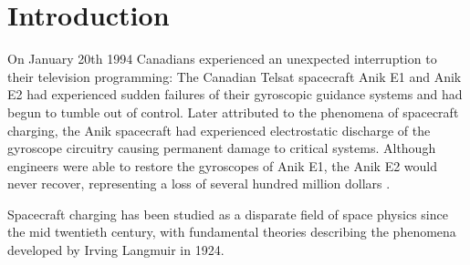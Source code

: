 \chapter{Introduction}
\label{sec:intro}

On January 20th 1994 Canadians experienced an unexpected interruption to their television programming: The Canadian Telsat spacecraft Anik E1 and Anik E2 had experienced sudden failures of their gyroscopic guidance systems and had begun to tumble out of control. Later attributed to the phenomena of spacecraft charging, the Anik spacecraft had experienced electrostatic discharge of the gyroscope circuitry causing permanent damage to critical systems. Although engineers were able to restore the gyroscopes of Anik E1, the Anik E2 would never recover, representing a loss of several hundred million dollars .

Spacecraft charging has been studied as a disparate field of space physics since the mid twentieth century, with fundamental theories describing the phenomena developed by Irving Langmuir in 1924. 


\parencite{Garrett1981} 




